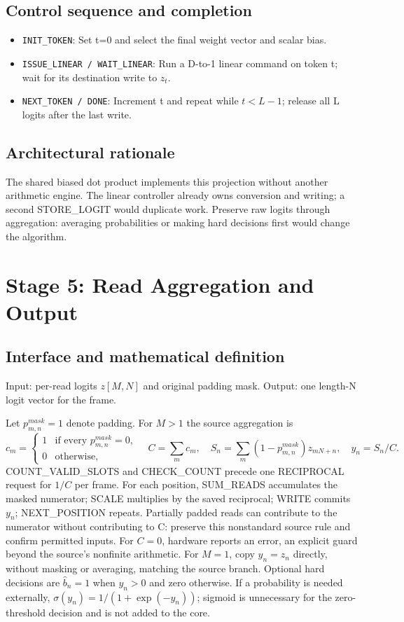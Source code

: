 \documentclass[11pt,a4paper]{article}
\begin{document}
\subsection{Control sequence and completion}
\begin{itemize}
\item \texttt{INIT\_TOKEN}: Set t=0 and select the final weight vector and scalar bias.
\item \texttt{ISSUE\_LINEAR / WAIT\_LINEAR}: Run a D-to-1 linear command on token t; wait for its destination write to $z_t$.
\item \texttt{NEXT\_TOKEN / DONE}: Increment t and repeat while $t<L-1$; release all L logits after the last write.
\end{itemize}

\subsection{Architectural rationale}
The shared biased dot product implements this projection without another arithmetic engine. The linear controller already owns conversion and writing; a second STORE\_LOGIT would duplicate work. Preserve raw logits through aggregation: averaging probabilities or making hard decisions first would change the algorithm.

\section{Stage 5: Read Aggregation and Output}
\subsection{Interface and mathematical definition}
Input: per-read logits $z[M,N]$ and original padding mask. Output: one length-N logit vector for the frame.

Let $p^{mask}_{m,n}=1$ denote padding. For $M>1$ the source aggregation is
\[
c_m=\begin{cases}1&\text{if every }p^{mask}_{m,n}=0,\\0&\text{otherwise},\end{cases}
\quad C=\sum_m c_m,\quad S_n=\sum_m(1-p^{mask}_{m,n})z_{mN+n},\quad y_n=S_n/C.
\]
COUNT\_VALID\_SLOTS and CHECK\_COUNT precede one RECIPROCAL request for $1/C$ per frame. For each position, SUM\_READS accumulates the masked numerator; SCALE multiplies by the saved reciprocal; WRITE commits $y_n$; NEXT\_POSITION repeats. Partially padded reads can contribute to the numerator without contributing to C: preserve this nonstandard source rule and confirm permitted inputs. For $C=0$, hardware reports an error, an explicit guard beyond the source's nonfinite arithmetic.
For $M=1$, copy $y_n=z_n$ directly, without masking or averaging, matching the source branch. Optional hard decisions are $\hat b_n=1$ when $y_n>0$ and zero otherwise. If a probability is needed externally, $\sigma(y_n)=1/(1+\exp(-y_n))$; sigmoid is unnecessary for the zero-threshold decision and is not added to the core.
\end{document}
